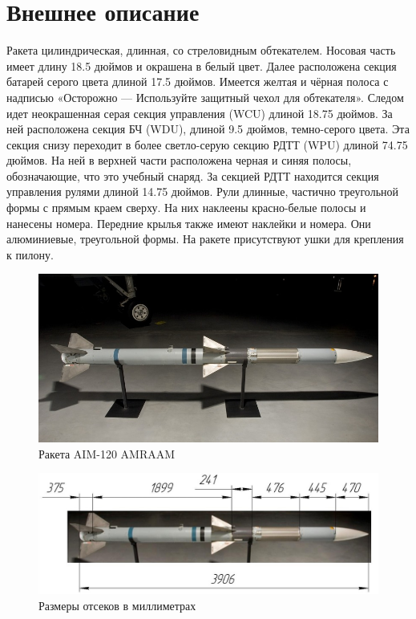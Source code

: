 \documentclass[a4paper,12pt]{report}
\begin{document}
\newpage
\section{Внешнее описание}
Ракета цилиндрическая, длинная, со стреловидным обтекателем.
Носовая часть имеет длину 18.5 дюймов и окрашена в белый цвет. Далее расположена секция батарей серого цвета длиной 17.5 дюймов. Имеется желтая и чёрная полоса с надписью «Осторожно — Используйте защитный чехол для обтекателя».
Следом идет неокрашенная серая секция управления (WCU) длиной 18.75 дюймов. За ней расположена секция БЧ (WDU), длиной 9.5 дюймов, темно-серого цвета.
Эта секция снизу переходит в более светло-серую секцию РДТТ (WPU) длиной 74.75 дюймов. На ней в верхней части расположена черная и синяя полосы, обозначающие, что это учебный снаряд.
За секцией РДТТ находится секция управления рулями длиной 14.75 дюймов. Рули длинные, частично треугольной формы с прямым краем сверху. На них наклеены красно-белые полосы и нанесены номера.
Передние крылья также имеют наклейки и номера. Они алюминиевые, треугольной формы. На ракете присутствуют ушки для крепления к пилону.


\begin{figure}[h!]
\centering
\includegraphics[width=0.55\textheight]{images/2.jpg}
\caption{Ракета AIM-120 AMRAAM}
\label{AIM-120}
\end{figure}

\begin{figure}[h!]
\centering
\includegraphics[width=0.65\textheight]{images/3.jpg}
\caption{Размеры отсеков в миллиметрах}
\label{AIM-120}
\end{figure}
\end{document}

